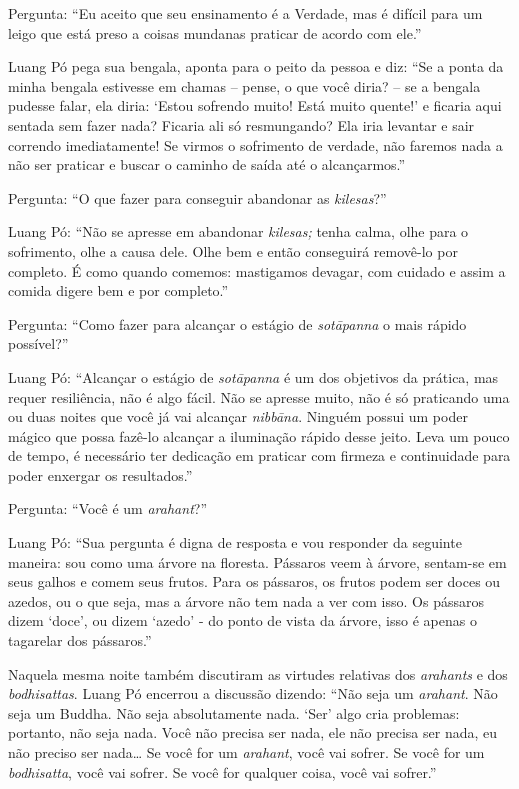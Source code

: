 Pergunta: ``Eu aceito que seu ensinamento é a Verdade, mas é difícil
para um leigo que está preso a coisas mundanas praticar de acordo com
ele.''

Luang Pó pega sua bengala, aponta para o peito da pessoa e diz: ``Se a
ponta da minha bengala estivesse em chamas -- pense, o que você diria?
-- se a bengala pudesse falar, ela diria: `Estou sofrendo muito! Está
muito quente!' e ficaria aqui sentada sem fazer nada? Ficaria ali só
resmungando? Ela iria levantar e sair correndo imediatamente! Se virmos
o sofrimento de verdade, não faremos nada a não ser praticar e buscar o
caminho de saída até o alcançarmos.''

Pergunta: ``O que fazer para conseguir abandonar as \emph{kilesas}?''

Luang Pó: ``Não se apresse em abandonar \emph{kilesas;} tenha calma,
olhe para o sofrimento, olhe a causa dele. Olhe bem e então conseguirá
removê-lo por completo. É como quando comemos: mastigamos devagar, com
cuidado e assim a comida digere bem e por completo.''

Pergunta: ``Como fazer para alcançar o estágio de \emph{sotāpanna} o
mais rápido possível?''

Luang Pó: ``Alcançar o estágio de \emph{sotāpanna} é um dos objetivos da
prática, mas requer resiliência, não é algo fácil. Não se apresse muito,
não é só praticando uma ou duas noites que você já vai alcançar
\emph{nibbāna}. Ninguém possui um poder mágico que possa fazê-lo
alcançar a iluminação rápido desse jeito. Leva um pouco de tempo, é
necessário ter dedicação em praticar com firmeza e continuidade para
poder enxergar os resultados.''

Pergunta: ``Você é um \emph{arahant}?''

Luang Pó: ``Sua pergunta é digna de resposta e vou responder da seguinte
maneira: sou como uma árvore na floresta. Pássaros veem à árvore,
sentam-se em seus galhos e comem seus frutos. Para os pássaros, os
frutos podem ser doces ou azedos, ou o que seja, mas a árvore não tem
nada a ver com isso. Os pássaros dizem `doce', ou dizem `azedo' - do
ponto de vista da árvore, isso é apenas o tagarelar dos pássaros.''

Naquela mesma noite também discutiram as virtudes relativas dos
\emph{arahants} e dos \emph{bodhisattas}. Luang Pó encerrou a discussão
dizendo: ``Não seja um \emph{arahant}. Não seja um Buddha. Não seja
absolutamente nada. `Ser' algo cria problemas: portanto, não seja nada.
Você não precisa ser nada, ele não precisa ser nada, eu não preciso ser
nada\ldots{} Se você for um \emph{arahant}, você vai sofrer. Se você for
um \emph{bodhisatta}, você vai sofrer. Se você for qualquer coisa, você
vai sofrer.''

